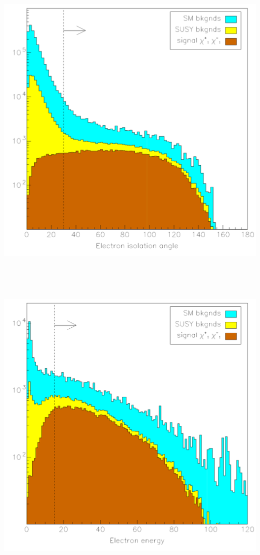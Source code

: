 \documentclass[landscape]{article}
\begin{document}
\mbox{ }

\vfill

\begin{center}
  \includegraphics[width=0.7\linewidth]{allnew_4.pdf}
\end{center}

\vfill

\mbox{ }

\pagebreak

\mbox{ }

\vfill

\begin{center}
  \includegraphics[width=0.7\linewidth]{allnew_5.pdf}
\end{center}

\vfill

\mbox{ }

\pagebreak
\end{document}

